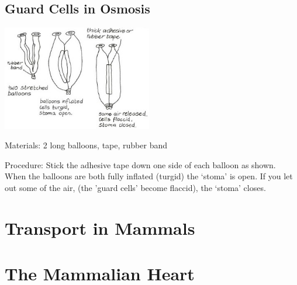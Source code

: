 \begin{multicols}{2}
\subsection{Guard Cells in Osmosis}

\begin{center}
\includegraphics[width=0.49\textwidth]{./img/vso/osmosis-guard-cells.jpg}
\end{center}

\begin{description*}
\item[Materials:]{2 long balloons, tape, rubber band}
\item[Procedure:]{Stick the adhesive tape down one
side of each balloon as shown.
When the balloons are both fully
inflated (turgid) the `stoma' is
open. If you let out some of the
air, (the 'guard cells' become
flaccid), the `stoma' closes.}
\end{description*}

\columnbreak


\section*{Transport in Mammals}


\section*{The Mammalian Heart}



\end{multicols}
